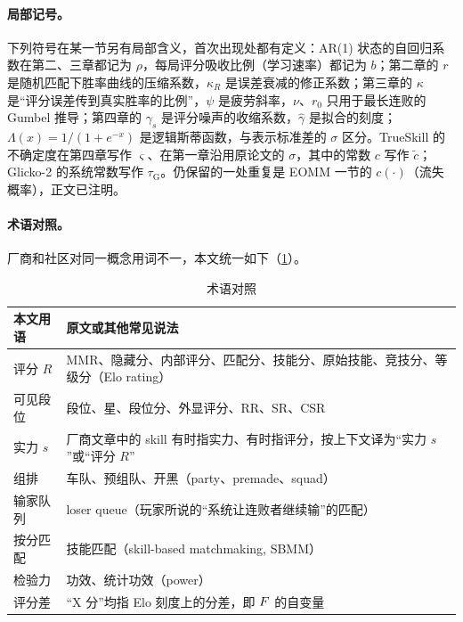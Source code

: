 \paragraph{局部记号。}下列符号在某一节另有局部含义，首次出现处都有定义：AR(1) 状态的自回归系数在第二、三章都记为 $\rho$，每局评分吸收比例（学习速率）都记为 $b$；第二章的 $r$ 是随机匹配下胜率曲线的压缩系数，$\kappa_R$ 是误差衰减的修正系数；第三章的 $\kappa$ 是“评分误差传到真实胜率的比例”，$\psi$ 是疲劳斜率，$\nu$、$r_0$ 只用于最长连败的 Gumbel 推导；第四章的 $\gamma_s$ 是评分噪声的收缩系数，$\hat\gamma$ 是拟合的刻度；$\Lambda(x)=1/(1+e^{-x})$ 是逻辑斯蒂函数，与表示标准差的 $\sigma$ 区分。TrueSkill 的不确定度在第四章写作 $\varsigma$、在第一章沿用原论文的 $\sigma$，其中的常数 $c$ 写作 $\tilde c$；Glicko-2 的系统常数写作 $\tau_{\mathrm G}$。仍保留的一处重复是 EOMM 一节的 $c(\cdot)$（流失概率），正文已注明。

\paragraph{术语对照。}厂商和社区对同一概念用词不一，本文统一如下（\cref{tab:intro-terms}）。

\begin{table}[htbp]
  \centering\small
  \caption{术语对照}
  \label{tab:intro-terms}
  \begin{tabularx}{\linewidth}{@{}>{\raggedright\arraybackslash}p{3.0cm}>{\raggedright\arraybackslash}X@{}}
    \toprule
    本文用语 & 原文或其他常见说法 \\
    \midrule
    评分 $R$ & MMR、隐藏分、内部评分、匹配分、技能分、原始技能、竞技分、等级分（Elo rating）\\
    可见段位 & 段位、星、段位分、外显评分、RR、SR、CSR \\
    实力 $s$ & 厂商文章中的 skill 有时指实力、有时指评分，按上下文译为“实力 $s$”或“评分 $R$” \\
    组排 & 车队、预组队、开黑（party、premade、squad）\\
    输家队列 & loser queue（玩家所说的“系统让连败者继续输”的匹配）\\
    按分匹配 & 技能匹配（skill-based matchmaking, SBMM）\\
    检验力 & 功效、统计功效（power）\\
    评分差 & “X 分”均指 Elo 刻度上的分差，即 $F$ 的自变量 \\
    \bottomrule
  \end{tabularx}
\end{table}

